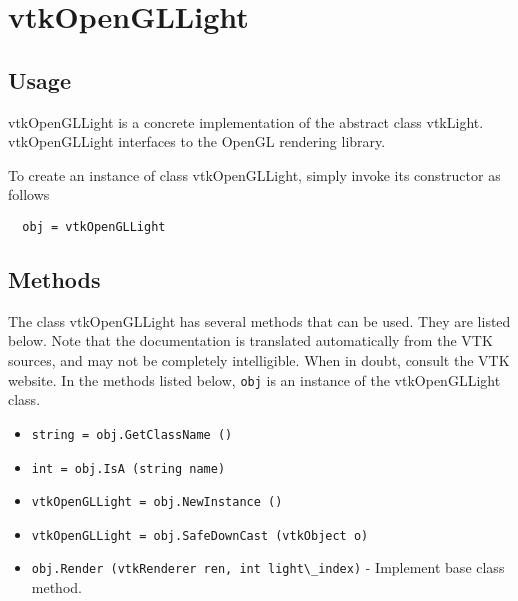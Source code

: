 \section{vtkOpenGLLight}

\subsection{Usage}

 vtkOpenGLLight is a concrete implementation of the abstract class vtkLight.
 vtkOpenGLLight interfaces to the OpenGL rendering library.

To create an instance of class vtkOpenGLLight, simply
invoke its constructor as follows
\begin{verbatim}
  obj = vtkOpenGLLight
\end{verbatim}
\subsection{Methods}

The class vtkOpenGLLight has several methods that can be used.
  They are listed below.
Note that the documentation is translated automatically from the VTK sources,
and may not be completely intelligible.  When in doubt, consult the VTK website.
In the methods listed below, \verb|obj| is an instance of the vtkOpenGLLight class.
\begin{itemize}
\item  \verb|string = obj.GetClassName ()|

\item  \verb|int = obj.IsA (string name)|

\item  \verb|vtkOpenGLLight = obj.NewInstance ()|

\item  \verb|vtkOpenGLLight = obj.SafeDownCast (vtkObject o)|

\item  \verb|obj.Render (vtkRenderer ren, int light\_index)| -  Implement base class method.

\end{itemize}
